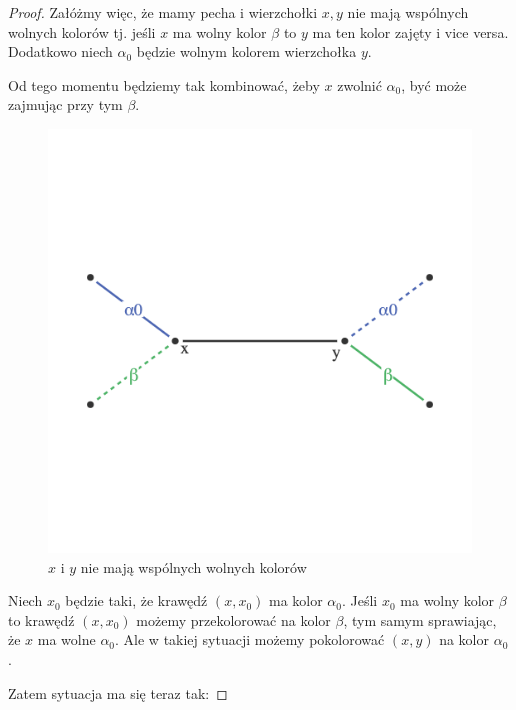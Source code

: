 \begin{proof}
	Załóżmy więc, że mamy pecha i wierzchołki $x, y$ nie mają wspólnych wolnych kolorów tj. jeśli $x$ ma wolny kolor $\beta$
	to $y$ ma ten kolor zajęty i vice versa. Dodatkowo niech $\alpha_0$ będzie wolnym kolorem wierzchołka $y$.

	Od tego momentu będziemy tak kombinować, żeby $x$ zwolnić $\alpha_0$, być może zajmując przy tym $\beta$.

	\begin{figure}[H]
		\centering
		\includegraphics[scale=0.6]{images/vizing/pre_step_one.png}
		\caption{$x$ i $y$ nie mają wspólnych wolnych kolorów}
	\end{figure}


	Niech $x_0$ będzie taki, że krawędź $(x, x_0)$ ma kolor $\alpha_0$. Jeśli $x_0$ ma wolny kolor $\beta$
	to krawędź $(x, x_0)$ możemy przekolorować na kolor $\beta$,
	tym samym sprawiając, że $x$ ma wolne $\alpha_0$.
	Ale w takiej sytuacji możemy pokolorować $(x, y)$ na kolor $\alpha_0$.

	Zatem sytuacja ma się teraz tak:


\end{proof}
